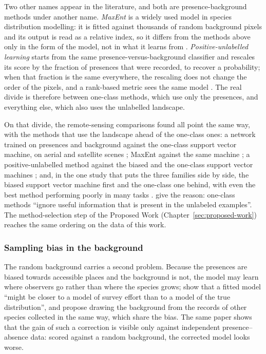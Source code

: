 Two other names appear in the literature, and both are
presence-background methods under another name. \emph{MaxEnt} is a widely
used model in species distribution modelling: it is fitted against
thousands of random background pixels and its output is read as a
relative index, so it differs from the methods above only in the form
of the model, not in what it learns from \cite{phillips2006}.
\emph{Positive-unlabelled learning} starts from the same
presence-versus-background classifier and rescales its score by the
fraction of presences that were recorded, to recover a probability;
when that fraction is the same everywhere, the rescaling does not
change the order of the pixels, and a rank-based metric sees the same
model \cite{elkan2008}. The real divide is therefore between one-class
methods, which use only the presences, and everything else, which also
uses the unlabelled landscape.

On that divide, the remote-sensing comparisons found all point the
same way, with the methods that use the landscape ahead of the
one-class ones: a network trained on presences and
background against the one-class support vector machine, on aerial and
satellite scenes \cite{deng2018}; MaxEnt against the same machine
\cite{li2010}; a positive-unlabelled method against the biased and the
one-class support vector machines \cite{li2011}; and, in the one study
that puts the three families side by side, the biased support vector
machine first and the one-class one behind, with even the best method
performing poorly in many tasks \cite{mack2017}. \citet{elkan2008}
give the reason: one-class methods ``ignore useful information that is
present in the unlabeled examples''. The method-selection step of the
Proposed Work (Chapter~\ref{sec:proposed-work}) reaches the same
ordering on the data of this work.

\subsubsection*{Sampling bias in the background}

The random background carries a second problem. Because the presences
are biased towards accessible places and the background is not, the
model may learn where observers go rather than where the species
grows; \citet{phillips2009} show that a fitted model ``might be closer
to a model of survey effort than to a model of the true
distribution'', and propose drawing the background from the records
of other species collected in the same way, which share the bias. The
same paper shows that the gain of such a correction is visible only
against independent presence--absence data: scored against a random
background, the corrected model looks worse.

